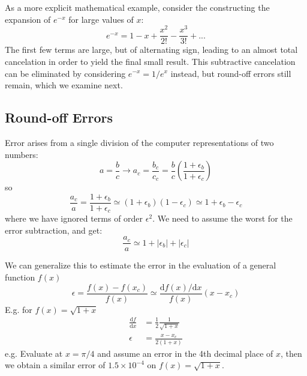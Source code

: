 \documentclass[../../../main.tex]{subfiles}
\begin{document}
As a more explicit mathematical example, consider the constructing the expansion of $e^{-x}$ for large values of $x$:
\begin{equation*}
    e^{-x} = 1 - x + \frac{x^2}{2!} - \frac{x^3}{3!} + ...
\end{equation*}
The first few terms are large, but of alternating sign, leading to an almost total cancelation in order to yield the final small result.
This subtractive cancelation can be eliminated by considering $e^{-x} = 1/e^x$ instead, but round-off errors still remain, which we examine next.

\subsection{Round-off Errors}
Error arises from a single division of the computer representations of two numbers:
\begin{equation*}
    a = \frac{b}{c} \rightarrow a_c = \frac{b_c}{c_c} = \frac{b}{c} \left( \frac{1+\epsilon_b}{1+\epsilon_c} \right)
\end{equation*}
so
\begin{equation*}
    \frac{a_c}{a} = \frac{1+\epsilon_b}{1+\epsilon_c} \simeq (1+\epsilon_b) (1- \epsilon_c) \simeq 1 + \epsilon_b - \epsilon_c
\end{equation*}
where we have ignored terms of order $\epsilon^2$.
We need to assume the worst for the error subtraction, and get:
\begin{equation*}
    \frac{a_c}{a} \simeq 1 + |\epsilon_b| + |\epsilon_c|
\end{equation*}

We can generalize this to estimate the error in the evaluation of a general function $f(x)$
\begin{equation*}
    \epsilon = \frac{ f(x) - f(x_c) } { f(x) } \simeq \frac{\mathrm{d} f(x) / \mathrm{d}x}{f(x)} (x-x_c)
\end{equation*}
E.g. for $f(x) = \sqrt{1+x}$
\begin{align*}
    \frac{ \mathrm{d} f}{\mathrm{d}x} & = \frac{1}{2} \frac{1}{\sqrt{1+x}} \\
    \epsilon                          & = \frac{x - x_c}{2 (1+x) }
\end{align*}
e.g. Evaluate at $x=\pi/4$ and assume an error in the 4th decimal place of $x$, then we obtain a similar error of $1.5\times 10^{-4}$ on $f(x) = \sqrt{1+x}$.
\end{document}
